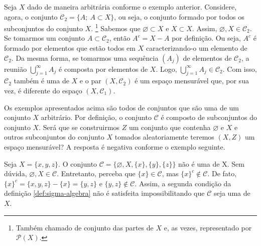 \begin{example}
	\label{ex:sigma-subconjuntos}
	Seja $X$ dado de maneira arbitrária conforme o exemplo anterior.
	Considere, agora, o conjunto $\mathcal{C}_2 = \{ A; \ A \subset X\}$, ou seja, o conjunto formado por todos os subconjuntos do conjunto $X$.
	\footnote{Também chamado de conjunto das partes de $X$ e, as vezes, representado por $\mathcal{P}(X)$.}
	Sabemos que $\varnothing \subset X$ e $X \subset X$. 
	Assim, $\varnothing, X \in \mathcal{C}_2$. 
	Se tomarmos um conjunto $A \subset \mathcal{C}_2$, então $A^c = X - A$ por definição.
	Ou seja, $A^c$ é formado por elementos que estão todos em $X$ caracterizando-o um elemento de $\mathcal{C}_2$.
	Da mesma forma, se tomarmos uma sequência $(A_j)$ de elementos de $\mathcal{C}_2$, a reunião 
	$\displaystyle \bigcup_{j = 1}^\infty A_j$ é composta por elementos de $X$.
	Logo,  $\displaystyle \bigcup_{j = 1}^\infty A_j \in \mathcal{C}_2$.
	Com isso, $\mathcal{C}_2$ também é uma \sigal de $X$ e o par $(X, \mathcal{C}_2)$ é um espaço mensurável que, por sua vez, é diferente do espaço $(X,\mathcal{C}_1)$.
\end{example}




Os exemplos apresentados acima são todos de conjuntos que são uma \sigal de um conjunto $X$ arbitrário.
Por definição, o conjunto $\mathcal{C}$ é composto de subconjuntos do conjunto $X$. 
Será que se construirmos $Z$ um conjunto que contenha $\varnothing$ e $X$ e outros subconjuntos do conjunto $X$ tomados aleatoriamente teremos $(X,Z)$ um espaço mensurável? A resposta é negativa conforme o exemplo seguinte.

\begin{counterexample}
    Seja $X = \{x,y,z\}$. O conjunto $\mathcal{C} = \{\varnothing, X, \{x\}, \{y\}, \{z\}\}$ não é uma \sigal de X.
    Sem dúvida, $\varnothing, X \in \mathcal{C}$. 
    Entretanto, perceba que $\{x\} \in \mathcal{C}$, mas $\{x\}^c \notin \mathcal{C}$.
    De fato, $\{x\}^c =\{x,y,z\} -\{x\} = \{y,z\}$ e $\{y,z\} \notin \mathcal{C}$.
    Assim, a segunda condição da definição \ref{def:sigma-algebra} não é satisfeita impossibilitando que $\mathcal{C}$ seja uma \sigal de $X$.
    
\end{counterexample}


